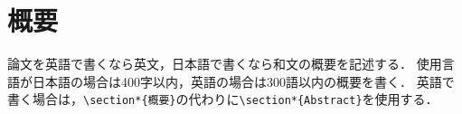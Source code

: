 \section*{概要}

論文を英語で書くなら英文，日本語で書くなら和文の概要を記述する．
使用言語が日本語の場合は400字以内，英語の場合は300語以内の概要を書く．
英語で書く場合は，\verb|\section*{概要}|の代わりに\verb|\section*{Abstract}|を使用する．


\clearpage